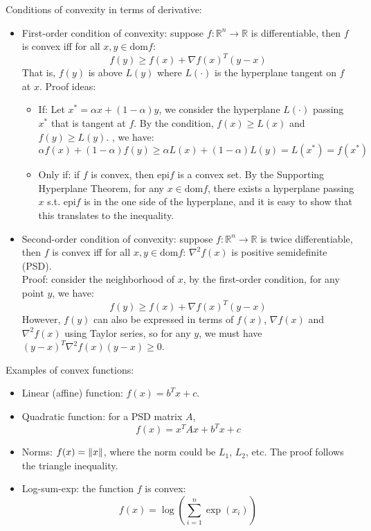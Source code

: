 \documentclass{report}
\begin{document}
Conditions of convexity in terms of derivative: 
\begin{itemize}
\item First-order condition of convexity: suppose $f: \mathbb{R}^n \rightarrow \mathbb{R}$ is differentiable, then $f$ is convex iff for all $x, y \in \text{dom}f$:
\begin{equation}
f(y) \geq f(x) + \nabla f(x)^T (y - x)	
\end{equation}
That is, $f(y)$ is above $L(y)$ where $L(\cdot)$ is the hyperplane tangent on $f$ at $x$. Proof ideas: 
\begin{itemize}
\item If: Let $x^* = \alpha x + (1 - \alpha) y$, we consider the hyperplane $L(\cdot)$ passing $x^*$ that is tangent at $f$. By the condition, $f(x) \geq L(x)$ and $f(y) \geq L(y)$. , we have:
\begin{equation}
\alpha f(x) + (1-\alpha) f(y) \geq \alpha L(x) + (1-\alpha) L(y)	= L(x^*) = f(x^*)
\end{equation}

\item Only if: if $f$ is convex, then $\text{epi} f$ is a convex set. By the Supporting Hyperplane Theorem, for any $x \in \text{dom}f$, there exists a hyperplane passing $x$ s.t. $\text{epi} f$ is in the one side of the hyperplane, and it is easy to show that this translates to the inequality. 
\end{itemize}

\item Second-order condition of convexity: suppose $f: \mathbb{R}^n \rightarrow \mathbb{R}$ is twice differentiable, then $f$ is convex iff for all $x, y \in \text{dom}f$: $\nabla ^2 f(x)$ is positive semidefinite (PSD). \\
Proof: consider the neighborhood of $x$, by the first-order condition, for any point $y$, we have: 
\begin{equation}
f(y) \geq f(x) + \nabla f(x)^T (y - x)	
\end{equation}
However, $f(y)$ can also be expressed in terms of $f(x)$, $\nabla f(x)$ and $\nabla^2 f(x)$ using Taylor series, so for any $y$, we must have $(y - x)^T \nabla^2f(x) (y-x) \geq 0$. 
\end{itemize}

Examples of convex functions: 
\begin{itemize}
\item Linear (affine) function: $f(x) = b^T x + c$. 

\item Quadratic function: for a PSD matrix $A$, 
\begin{equation}
f(x) = x^T A x + b^T x + c	
\end{equation}

\item Norms: $f(x) = \lVert x\rVert$, where the norm could be $L_1$, $L_2$, etc. The proof follows the triangle inequality. 

\item Log-sum-exp: the function $f$ is convex: 
\begin{equation}
f(x) = \log \left( \sum_{i=1}^n \exp(x_i)\right)	
\end{equation}
\end{itemize}
\end{document}
